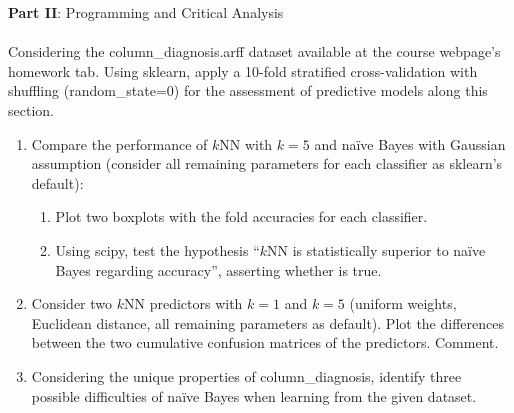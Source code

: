 \documentclass[12pt]{article}
\begin{document}
\vskip 1cm

\large{\textbf{Part II}: Programming and Critical Analysis}\normalsize

\paragraph{}Considering the column\_diagnosis.arff dataset available at the course webpage’s homework tab.
Using sklearn, apply a 10-fold stratified cross-validation with shuffling (random\_state=0) for the
assessment of predictive models along this section.

\begin{enumerate}[leftmargin=\labelsep]
    \item Compare the performance of $k$NN with $k = 5$ and naïve Bayes with Gaussian assumption
    (consider all remaining parameters for each classifier as sklearn's default):

    \begin{enumerate}
        \item Plot two boxplots with the fold accuracies for each classifier.
        \item Using scipy, test the hypothesis “$k$NN is statistically superior to naïve Bayes regarding
        accuracy”, asserting whether is true.
    \end{enumerate}

    \item Consider two $k$NN predictors with $k = 1$ and $k = 5$ (uniform weights, Euclidean distance,
    all remaining parameters as default). Plot the differences between the two cumulative confusion
    matrices of the predictors. Comment.

    \item Considering the unique properties of column\_diagnosis, identify three possible difficulties
    of naïve Bayes when learning from the given dataset.
\end{enumerate}
\end{document}
